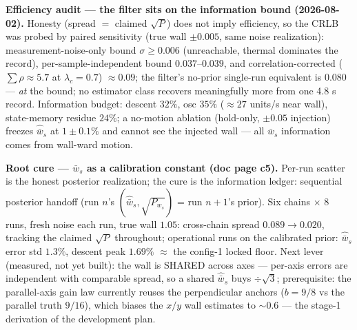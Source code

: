 \documentclass[11pt,a4paper,fontset=none]{ctexart}
\begin{document}
\textbf{Efficiency audit --- the filter sits on the information bound
(2026-08-02).}  Honesty (spread $=$ claimed $\sqrt{P}$) does not imply
efficiency, so the CRLB was probed by paired sensitivity (true wall
$\pm 0.005$, same noise realization): measurement-noise-only bound
$\sigma \geq 0.006$ (unreachable, thermal dominates the record),
per-sample-independent bound $0.037$--$0.039$, and
correlation-corrected ($\sum\rho \approx 5.7$ at $\lambda_c = 0.7$)
$\approx 0.09$; the filter's no-prior single-run equivalent is $0.080$
--- \emph{at} the bound; no estimator class recovers meaningfully more
from one 4.8 s record.  Information budget: descent $32\%$, osc $35\%$
($\approx 27$ units/s near wall), state-memory residue $24\%$; a
no-motion ablation (hold-only, $\pm 0.05$ injection) freezes
$\hat{\bar{w}}_s$ at $1 \pm 0.1\%$ and cannot see the injected wall ---
all $\bar{w}_s$ information comes from wall-ward motion.

\textbf{Root cure --- $\bar{w}_s$ as a calibration constant (doc page
c5).}  Per-run scatter is the honest posterior realization; the cure is
the information ledger: sequential posterior handoff (run $n$'s
$(\hat{\bar{w}}_s, \sqrt{P_{w_s}})$ = run $n{+}1$'s prior).  Six chains
$\times$ 8 runs, fresh noise each run, true wall $1.05$: cross-chain
spread $0.089 \to 0.020$, tracking the claimed $\sqrt{P}$ throughout;
operational runs on the calibrated prior: $\hat{\bar{w}}_s$ error std
$1.3\%$, descent peak $1.69\%$ $\approx$ the config-1 locked floor.
Next lever (measured, not yet built): the wall is SHARED across axes
--- per-axis errors are independent with comparable spread, so a shared
$\hat{\bar{w}}_s$ buys $\div\sqrt{3}$; prerequisite: the parallel-axis
gain law currently reuses the perpendicular anchors ($b = 9/8$ vs the
parallel truth $9/16$), which biases the $x/y$ wall estimates to
$\sim 0.6$ --- the stage-1 derivation of the development plan.
\end{document}
